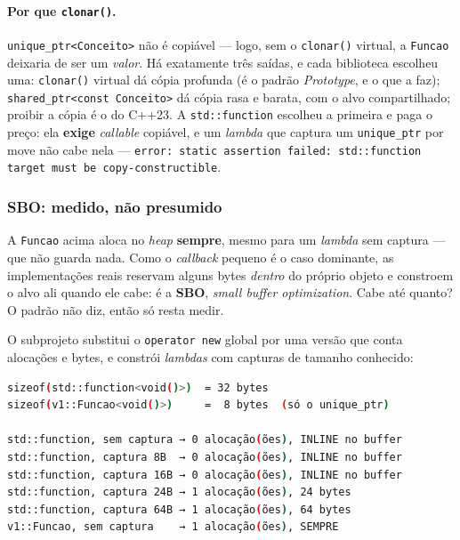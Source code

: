 \paragraph{Por que \texttt{clonar()}.} \texttt{unique\_ptr<Conceito>} não é
copiável --- logo, sem o \texttt{clonar()} virtual, a \texttt{Funcao} deixaria
de ser um \emph{valor}. Há exatamente três saídas, e cada biblioteca escolheu
uma: \texttt{clonar()} virtual dá cópia profunda (é o padrão \emph{Prototype}, e
o que a  faz); \texttt{shared\_ptr<const Conceito>} dá
cópia rasa e barata, com o alvo compartilhado; proibir a cópia é o
 do C++23. A \texttt{std::function} escolheu a
primeira e paga o preço: ela \textbf{exige} \emph{callable} copiável, e um
\emph{lambda} que captura um \texttt{unique\_ptr} por \gls{move} não cabe nela
--- \texttt{error: static assertion failed: std::function target must be
copy-constructible}.

\subsubsection{SBO: medido, não presumido}

\begin{porque}
A \texttt{Funcao} acima aloca no \emph{heap} \textbf{sempre}, mesmo para um
\emph{lambda} sem captura --- que não guarda nada. Como o \emph{callback}
pequeno é o caso dominante, as implementações reais reservam alguns bytes
\emph{dentro} do próprio objeto e constroem o alvo ali quando ele cabe: é a
\textbf{SBO}, \emph{small buffer optimization}. Cabe até quanto? O padrão não
diz, então só resta medir.
\end{porque}

O subprojeto substitui o \texttt{operator new} global por uma versão que conta
alocações e bytes, e constrói \emph{lambdas} com capturas de tamanho conhecido:

\begin{lstlisting}[style=bt, language=bash,
    caption={Saída de \texttt{src/type\_erasure/}: onde exatamente o
             \texttt{new} aparece.}]
sizeof(std::function<void()>)  = 32 bytes
sizeof(v1::Funcao<void()>)     =  8 bytes  (só o unique_ptr)

std::function, sem captura → 0 alocação(ões), INLINE no buffer
std::function, captura 8B  → 0 alocação(ões), INLINE no buffer
std::function, captura 16B → 0 alocação(ões), INLINE no buffer
std::function, captura 24B → 1 alocação(ões), 24 bytes
std::function, captura 64B → 1 alocação(ões), 64 bytes
v1::Funcao, sem captura    → 1 alocação(ões), SEMPRE
\end{lstlisting}

